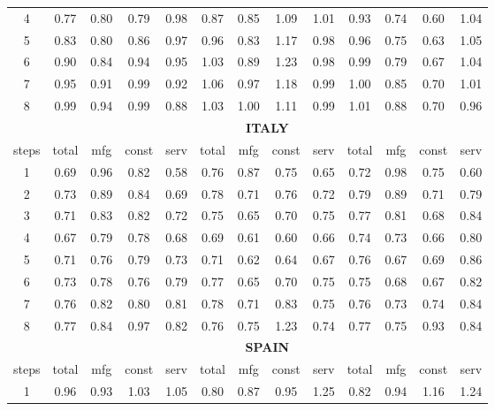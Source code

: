 \documentclass[11pt]{article}
\begin{document}
\begin{appendices}
\begin{table}[htbp]
\begin{tabular}{c|cccc|cccc|cccc}
    4     & 0.77  & 0.80  & 0.79  & 0.98  & 0.87  & 0.85  & 1.09  & 1.01  & 0.93  & 0.74  & 0.60  & 1.04 \\
    5     & 0.83  & 0.80  & 0.86  & 0.97  & 0.96  & 0.83  & 1.17  & 0.98  & 0.96  & 0.75  & 0.63  & 1.05 \\
    6     & 0.90  & 0.84  & 0.94  & 0.95  & 1.03  & 0.89  & 1.23  & 0.98  & 0.99  & 0.79  & 0.67  & 1.04 \\
    7     & 0.95  & 0.91  & 0.99  & 0.92  & 1.06  & 0.97  & 1.18  & 0.99  & 1.00  & 0.85  & 0.70  & 1.01 \\
    8     & 0.99  & 0.94  & 0.99  & 0.88  & 1.03  & 1.00  & 1.11  & 0.99  & 1.01  & 0.88  & 0.70  & 0.96 \\
    \midrule
    \multicolumn{1}{c}{} & \multicolumn{12}{c}{\textbf{ITALY}} \\
    \midrule
    steps & total & mfg   & const & serv  & total & mfg   & const & serv  & total & mfg   & const & serv \\
    \midrule
    1     & 0.69  & 0.96  & 0.82  & 0.58  & 0.76  & 0.87  & 0.75  & 0.65  & 0.72  & 0.98  & 0.75  & 0.60 \\
    2     & 0.73  & 0.89  & 0.84  & 0.69  & 0.78  & 0.71  & 0.76  & 0.72  & 0.79  & 0.89  & 0.71  & 0.79 \\
    3     & 0.71  & 0.83  & 0.82  & 0.72  & 0.75  & 0.65  & 0.70  & 0.75  & 0.77  & 0.81  & 0.68  & 0.84 \\
    4     & 0.67  & 0.79  & 0.78  & 0.68  & 0.69  & 0.61  & 0.60  & 0.66  & 0.74  & 0.73  & 0.66  & 0.80 \\
    5     & 0.71  & 0.76  & 0.79  & 0.73  & 0.71  & 0.62  & 0.64  & 0.67  & 0.76  & 0.67  & 0.69  & 0.86 \\
    6     & 0.73  & 0.78  & 0.76  & 0.79  & 0.77  & 0.65  & 0.70  & 0.75  & 0.75  & 0.68  & 0.67  & 0.82 \\
    7     & 0.76  & 0.82  & 0.80  & 0.81  & 0.78  & 0.71  & 0.83  & 0.75  & 0.76  & 0.73  & 0.74  & 0.84 \\
    8     & 0.77  & 0.84  & 0.97  & 0.82  & 0.76  & 0.75  & 1.23  & 0.74  & 0.77  & 0.75  & 0.93  & 0.84 \\
    \midrule
    \multicolumn{1}{c}{} & \multicolumn{12}{c}{\textbf{SPAIN}} \\
    \midrule
    steps & total & mfg   & const & serv  & total & mfg   & const & serv  & total & mfg   & const & serv \\
    \midrule
    1     & 0.96  & 0.93  & 1.03  & 1.05  & 0.80  & 0.87  & 0.95  & 1.25  & 0.82  & 0.94  & 1.16  & 1.24 \\

\end{tabular}
\end{table}
\end{appendices}
\end{document}

